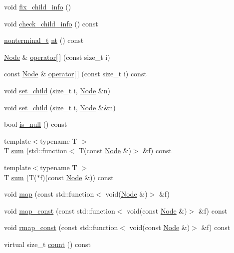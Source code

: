 \begin{DoxyCompactItemize}
\item 
void \hyperlink{class_node_a8f25f44608c0b19fe02eaf19ade9ea68}{fix\+\_\+child\+\_\+info} ()
\item 
void \hyperlink{class_node_ab8f9492893b0e2b2d7b3d1819dacc92b}{check\+\_\+child\+\_\+info} () const
\item 
\hyperlink{_nonterminal_8h_a5c1f658dc7560600a16d22408bd716ca}{nonterminal\+\_\+t} \hyperlink{class_node_a4abe3acdc804489a01ef13a25b130fd8}{nt} () const
\item 
\hyperlink{class_node}{Node} \& \hyperlink{class_node_a0b89084e2c7416379edb7c537edcc8f2}{operator\mbox{[}$\,$\mbox{]}} (const size\+\_\+t i)
\item 
const \hyperlink{class_node}{Node} \& \hyperlink{class_node_a8bdfdaa5eb291ae5fb417f45fb8a3633}{operator\mbox{[}$\,$\mbox{]}} (const size\+\_\+t i) const
\item 
void \hyperlink{class_node_afff50c3712b8e30fffd479cad4eee023}{set\+\_\+child} (size\+\_\+t i, \hyperlink{class_node}{Node} \&n)
\item 
void \hyperlink{class_node_a486882370d2c9592c6eabb52a3289253}{set\+\_\+child} (size\+\_\+t i, \hyperlink{class_node}{Node} \&\&n)
\item 
bool \hyperlink{class_node_a895ef3b66f975fbaec1e5866a57afbed}{is\+\_\+null} () const
\item 
{\footnotesize template$<$typename T $>$ }\\T \hyperlink{class_node_ac91282056a0df2835f1579bdd21c93e1}{sum} (std\+::function$<$ T(const \hyperlink{class_node}{Node} \&)$>$ \&f) const
\item 
{\footnotesize template$<$typename T $>$ }\\T \hyperlink{class_node_a089e99addd93f91b2ef5a9d0c3e6bdeb}{sum} (T($\ast$f)(const \hyperlink{class_node}{Node} \&)) const
\item 
void \hyperlink{class_node_adefac3cb7b411321c5af15dad1484834}{map} (const std\+::function$<$ void(\hyperlink{class_node}{Node} \&)$>$ \&f)
\item 
void \hyperlink{class_node_a4337bb93da78e142c6171fd81acab93c}{map\+\_\+const} (const std\+::function$<$ void(const \hyperlink{class_node}{Node} \&)$>$ \&f) const
\item 
void \hyperlink{class_node_a59da25cea338385d73b898b86492f97e}{rmap\+\_\+const} (const std\+::function$<$ void(const \hyperlink{class_node}{Node} \&)$>$ \&f) const
\item 
virtual size\+\_\+t \hyperlink{class_node_abd387b27e1deb45b789ad7b7abd8c6e6}{count} () const

\end{DoxyCompactItemize}
